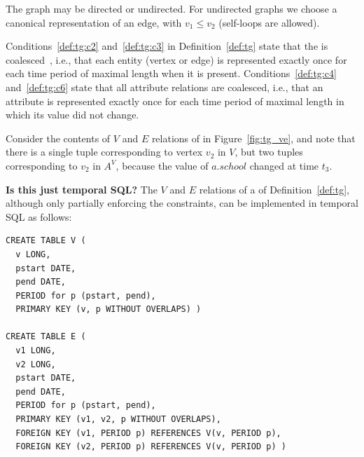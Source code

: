 The graph may be directed or undirected.  For undirected graphs we
choose a canonical representation of an edge, with $v_1 \leq v_2$
(self-loops are allowed).

Conditions~\ref{def:tg:c2} and~\ref{def:tg:c3} in
Definition~\ref{def:tg} state that the \tg is
coalesced~\cite{DBLP:conf/vldb/BohlenSS96}, i.e., that each entity
(vertex or edge) is represented exactly once for each time period of
maximal length when it is present.  Conditions~\ref{def:tg:c4}
and~\ref{def:tg:c6} state that all attribute relations are coalesced,
i.e., that an attribute is represented exactly once for each time
period of maximal length in which its value did not change.

Consider the contents of $V$ and $E$ relations of  in
Figure~\ref{fig:tg_ve}, and note that there is a single tuple
corresponding to vertex $v_2$ in $V$, but two tuples corresponding to
$v_2$ in $A^{V}$, because the value of $a.school$ changed at time
$t_3$.

{\bf Is this just temporal SQL?} The $V$ and $E$ relations of a \tg of
Definition~\ref{def:tg}, although only partially enforcing the
constraints, can be implemented in temporal SQL as follows:


\begin{small}
\begin{verbatim}
CREATE TABLE V (
  v LONG,
  pstart DATE,
  pend DATE,
  PERIOD for p (pstart, pend),
  PRIMARY KEY (v, p WITHOUT OVERLAPS) )

CREATE TABLE E (
  v1 LONG,
  v2 LONG,
  pstart DATE,
  pend DATE,
  PERIOD for p (pstart, pend),
  PRIMARY KEY (v1, v2, p WITHOUT OVERLAPS),
  FOREIGN KEY (v1, PERIOD p) REFERENCES V(v, PERIOD p),
  FOREIGN KEY (v2, PERIOD p) REFERENCES V(v, PERIOD p) )
\end{verbatim}
\end{small}

